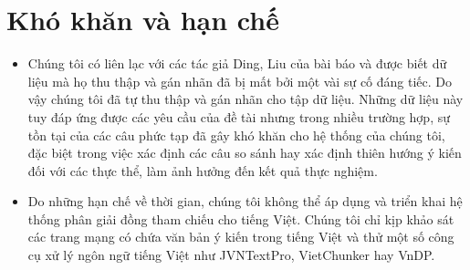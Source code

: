 \documentclass[12pt]{report}
\begin{document}
		\section*{Khó khăn và hạn chế}		
			\begin{itemize}
				\item{Chúng tôi có liên lạc với các tác giả Ding, Liu của bài báo \cite{mainpaper} và được biết dữ liệu mà họ thu thập và gán nhãn đã bị mất bởi một vài sự cố đáng tiếc. Do vậy chúng tôi đã tự thu thập và gán nhãn cho tập dữ liệu. Những dữ liệu này tuy đáp ứng được các yêu cầu của đề tài nhưng trong nhiều trường hợp, sự tồn tại của các câu phức tạp đã gây khó khăn cho hệ thống của chúng tôi, đặc biệt trong việc xác định các câu so sánh hay xác định thiên hướng ý kiến đối với các thực thể, làm ảnh hưởng đến kết quả thực nghiệm.}
				\item{Do những hạn chế về thời gian, chúng tôi không thể áp dụng và triển khai hệ thống phân giải đồng tham chiếu cho tiếng Việt. Chúng tôi chỉ kịp khảo sát các trang mạng có chứa văn bản ý kiến trong tiếng Việt và thử một số công cụ xử lý ngôn ngữ tiếng Việt như JVNTextPro, VietChunker hay VnDP.}
			\end{itemize}	
\end{document}
